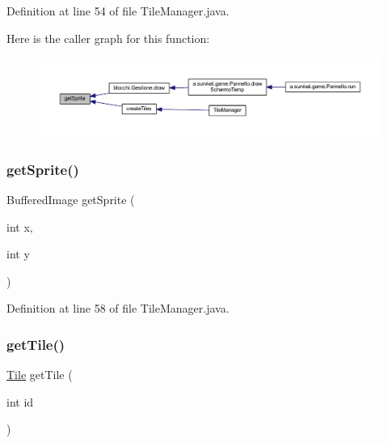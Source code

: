 Definition at line 54 of file Tile\+Manager.\+java.

Here is the caller graph for this function\+:
\nopagebreak
\begin{figure}[H]
\begin{center}
\leavevmode
\includegraphics[width=350pt]{classblocchi_1_1_tile_manager_a46ebd32c7ec4ac506010fe465687bdd7_icgraph}
\end{center}
\end{figure}
\mbox{\label{classblocchi_1_1_tile_manager_a96613c34a7cfb5341cc3c6a4fe3612a1}} 
\subsubsection{\texorpdfstring{get\+Sprite()}{getSprite()}\hspace{0.1cm}{\footnotesize\ttfamily [2/2]}}
{\footnotesize\ttfamily Buffered\+Image get\+Sprite (\begin{DoxyParamCaption}\item[{int}]{x,  }\item[{int}]{y }\end{DoxyParamCaption})\hspace{0.3cm}{\ttfamily [private]}}



Definition at line 58 of file Tile\+Manager.\+java.

\mbox{\label{classblocchi_1_1_tile_manager_a1855b58fdbe502789d9c14ee0deffb9e}} 
\subsubsection{\texorpdfstring{get\+Tile()}{getTile()}}
{\footnotesize\ttfamily \hyperlink{classblocchi_1_1_tile}{Tile} get\+Tile (\begin{DoxyParamCaption}\item[{int}]{id }\end{DoxyParamCaption})}



